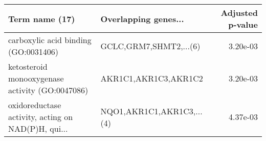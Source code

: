 \begin{tabular}{llr}
\toprule
                                    Term name (17) &      Overlapping genes... &  Adjusted p-value \\
\midrule
              carboxylic acid binding (GO:0031406) &    GCLC,GRM7,SHMT2,...(6) &          3.20e-03 \\
   ketosteroid monooxygenase activity (GO:0047086) &      AKR1C1,AKR1C3,AKR1C2 &          3.20e-03 \\
oxidoreductase activity, acting on NAD(P)H, qui... & NQO1,AKR1C1,AKR1C3,...(4) &          4.37e-03 \\
\bottomrule
\end{tabular}

